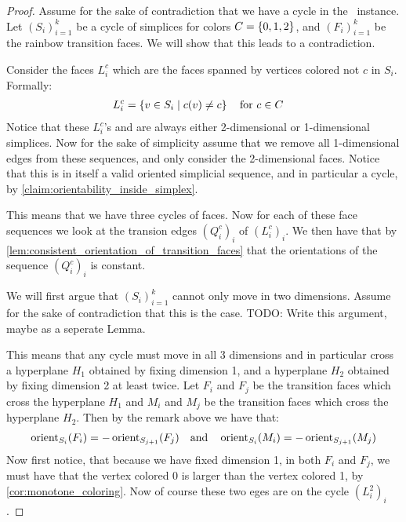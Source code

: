 \begin{proof}
	Assume for the sake of contradiction that we have a cycle in the \EndOfLine\ instance. Let ${\left(S_i\right)}_{i=1}^k$ be a cycle of simplices for colors $C = \left\{0, 1, 2\right\}$, and ${\left(F_i\right)}_{i=1}^k$ be the rainbow transition faces. We will show that this leads to a contradiction. \par

	Consider the faces $L_i^{c}$ which are the faces spanned by vertices colored not $c$ in $S_i$. Formally:
	\begin{align*}
		L_i^c & = \left\{v \in S_i \mid c(v) \neq c\right\} \quad \text{for $c \in C$}
	\end{align*}
	Notice that these $L_i^c$'s and are always either 2-dimensional or 1-dimensional simplices. Now for the sake of simplicity assume that we remove all 1-dimensional edges from these sequences, and only consider the 2-dimensional faces. Notice that this is in itself a valid oriented simplicial sequence, and in particular a cycle, by \cref{claim:orientability_inside_simplex}.

	This means that we have three cycles of faces. Now for each of these face sequences we look at the transion edges ${\left(Q_i^c\right)}_i$ of ${\left(L_i^c \right)}_i$.
	We then have that by \cref{lem:consistent_orientation_of_transition_faces} that the orientations of the sequence ${\left(Q_i^c\right)}_i$ is constant.

	We will first argue that ${\left(S_i\right)}_{i=1}^k$ cannot only move in two dimensions. Assume for the sake of contradiction that this is the case. TODO\@: Write this argument, maybe as a seperate Lemma.

	This means that any cycle must move in all 3 dimensions and in particular cross a hyperplane $H_1$ obtained by fixing dimension 1, and a hyperplane $H_2$ obtained by fixing dimension 2 at least twice. Let $F_i$ and $F_j$ be the transition faces which cross the hyperplane $H_1$ and $M_i$ and $M_j$ be the transition faces which cross the hyperplane $H_2$. Then by the remark above we have that:
	\begin{align*}
		\operatorname{orient}_{S_i}(F_i) = - \operatorname{orient}_{S_{j+1}}(F_j) \quad \text{and} \quad \operatorname{orient}_{S_i}(M_i) = - \operatorname{orient}_{S_{j+1}}(M_j)
	\end{align*}
	Now first notice, that because we have fixed dimension 1, in both $F_i$ and $F_j$, we must have that the vertex colored 0 is larger than the vertex colored 1, by \cref{cor:monotone_coloring}. Now of course these two eges are on the cycle ${(L_i^2)}_i$.


\end{proof}
